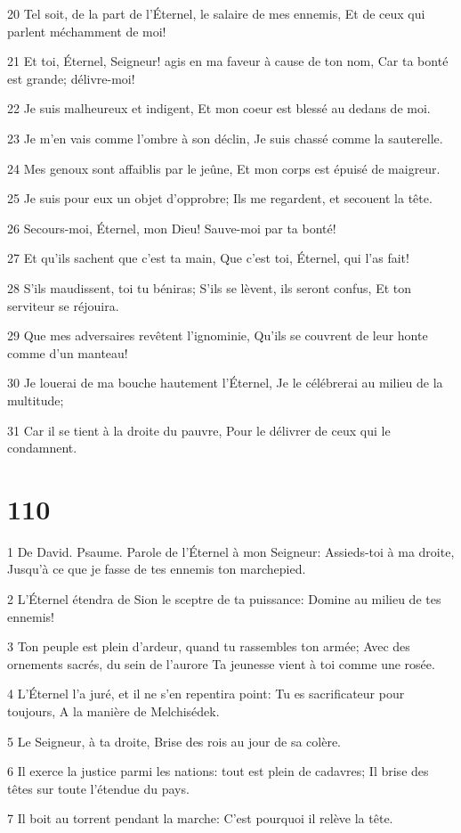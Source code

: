 \par 20 Tel soit, de la part de l'Éternel, le salaire de mes ennemis, Et de ceux qui parlent méchamment de moi!
\par 21 Et toi, Éternel, Seigneur! agis en ma faveur à cause de ton nom, Car ta bonté est grande; délivre-moi!
\par 22 Je suis malheureux et indigent, Et mon coeur est blessé au dedans de moi.
\par 23 Je m'en vais comme l'ombre à son déclin, Je suis chassé comme la sauterelle.
\par 24 Mes genoux sont affaiblis par le jeûne, Et mon corps est épuisé de maigreur.
\par 25 Je suis pour eux un objet d'opprobre; Ils me regardent, et secouent la tête.
\par 26 Secours-moi, Éternel, mon Dieu! Sauve-moi par ta bonté!
\par 27 Et qu'ils sachent que c'est ta main, Que c'est toi, Éternel, qui l'as fait!
\par 28 S'ils maudissent, toi tu béniras; S'ils se lèvent, ils seront confus, Et ton serviteur se réjouira.
\par 29 Que mes adversaires revêtent l'ignominie, Qu'ils se couvrent de leur honte comme d'un manteau!
\par 30 Je louerai de ma bouche hautement l'Éternel, Je le célébrerai au milieu de la multitude;
\par 31 Car il se tient à la droite du pauvre, Pour le délivrer de ceux qui le condamnent.

\chapter{110}

\par 1 De David. Psaume. Parole de l'Éternel à mon Seigneur: Assieds-toi à ma droite, Jusqu'à ce que je fasse de tes ennemis ton marchepied.
\par 2 L'Éternel étendra de Sion le sceptre de ta puissance: Domine au milieu de tes ennemis!
\par 3 Ton peuple est plein d'ardeur, quand tu rassembles ton armée; Avec des ornements sacrés, du sein de l'aurore Ta jeunesse vient à toi comme une rosée.
\par 4 L'Éternel l'a juré, et il ne s'en repentira point: Tu es sacrificateur pour toujours, A la manière de Melchisédek.
\par 5 Le Seigneur, à ta droite, Brise des rois au jour de sa colère.
\par 6 Il exerce la justice parmi les nations: tout est plein de cadavres; Il brise des têtes sur toute l'étendue du pays.
\par 7 Il boit au torrent pendant la marche: C'est pourquoi il relève la tête.

